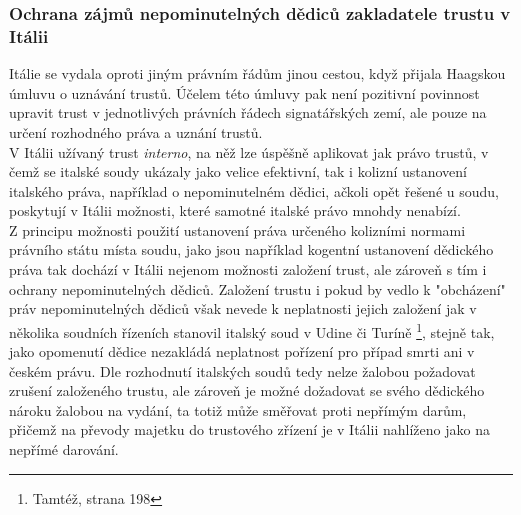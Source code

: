 \documentclass{article}
\begin{document}


\subsubsection{Ochrana zájmů nepominutelných dědiců zakladatele trustu v Itálii}

Itálie se vydala oproti jiným právním řádům jinou cestou, když přijala Haagskou úmluvu o uznávání trustů. Účelem této úmluvy pak není pozitivní povinnost upravit trust v jednotlivých právních řádech signatářských zemí, ale pouze na určení rozhodného práva a uznání trustů.\\

V Itálii užívaný trust \textit{interno}, na něž lze úspěšně aplikovat jak právo trustů, v čemž se italské soudy ukázaly jako velice efektivní, tak i kolizní ustanovení italského práva, například o nepominutelném dědici, ačkoli opět řešené u soudu, poskytují v Itálii možnosti, které samotné italské právo mnohdy nenabízí.\\

Z principu možnosti použití ustanovení práva určeného kolizními normami právního státu místa soudu, jako jsou například kogentní ustanovení dědického práva tak dochází v Itálii nejenom možnosti založení trust, ale zároveň s tím i ochrany nepominutelných dědiců. Založení trustu i pokud by vedlo k "obcházení" práv nepominutelných dědiců však nevede k neplatnosti jejich založení jak v několika soudních řízeních stanovil italský soud v Udine či Turíně \footnote{Tamtéž, strana 198}, stejně tak, jako opomenutí dědice nezakládá neplatnost pořízení pro případ smrti ani v českém právu. Dle rozhodnutí italských soudů tedy nelze žalobou požadovat zrušení založeného trustu, ale zároveň je možné dožadovat se svého dědického nároku žalobou na vydání, ta totiž může směřovat proti nepřímým darům, přičemž na převody majetku do trustového zřízení je v Itálii nahlíženo jako na nepřímé darování.\\
\end{document}
